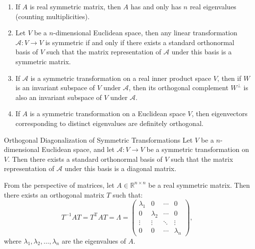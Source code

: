 \documentclass[11pt]{../../TexTemplate/elegantbook} %
\begin{document}
\begin{lemma}
    \begin{enumerate}
        \item If \( A \) is real symmetric matrix, then \( A \) has and only has \( n \) real eigenvalues (counting multiplicities). 
        \item Let \(V\) be a \(n\)-dimensional Euclidean space, 
            then any linear transformation \( \mathcal{A}: V \to V \) is symmetric if and only if
            there exists a standard orthonormal basis of \( V \) such that 
            the matrix representation of \( \mathcal{A} \) under this basis is a symmetric matrix.
        \item If \( \mathcal{A} \) is a symmetric transformation on a real inner product space \( V \),
            then if \(W\) is an invariant subspace of \( V \) under \( \mathcal{A} \),
            then its orthogonal complement \( W^{\perp} \) is also an invariant subspace of \( V \) under \( \mathcal{A} \).
        \item If \(A\) is a symmetric transformation on a Euclidean space \( V \),
            then eigenvectors corresponding to distinct eigenvalues are definitely orthogonal.
    \end{enumerate}
\end{lemma}

\begin{theorem}{Orthogonal Diagonalization of Symmetric Transformations}
    Let \( V \) be a \( n \)-dimensional Euclidean space, 
    and let \( \mathcal{A}: V \to V \) be a symmetric transformation on \( V \).
    Then there exists a standard orthonormal basis of \( V \) such that 
    the matrix representation of \( \mathcal{A} \) under this basis is a diagonal matrix.
    
    From the perspective of matrices,
    let \( A \in \mathbb{R}^{n \times n} \) be a real symmetric matrix.
    Then there exists an orthogonal matrix \( T \) such that:
    \[
    T^{-1} A T = T^{\mathrm{T}} A T = \Lambda = 
        \begin{pmatrix}
        \lambda_1 & 0 & \cdots & 0 \\
        0 & \lambda_2 & \cdots & 0 \\
        \vdots & \vdots & \ddots & \vdots \\
        0 & 0 & \cdots & \lambda_n
        \end{pmatrix},
    \]
    where \( \lambda_1, \lambda_2, \dots, \lambda_n \) are the eigenvalues of \( A \).
\end{theorem}
\end{document}
